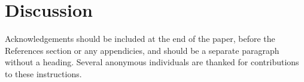 \documentclass{jfm}
\begin{document}
\section{Discussion}

Acknowledgements should be included at the end of the paper, before the References section or any appendicies, and should be a separate paragraph without a heading. Several anonymous individuals are thanked for contributions to these instructions.



\end{document}
